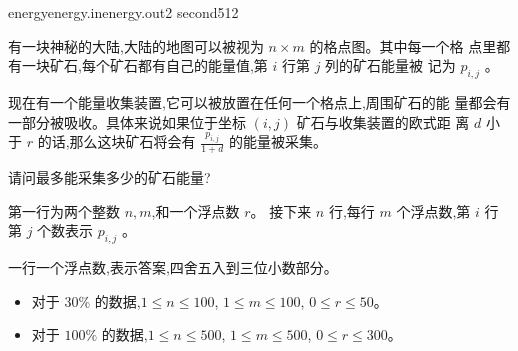 \documentclass[11pt,a4paper,oneside]{article}
\begin{document}
\begin{problem}{energy}{energy.in}{energy.out}{2 second}{512}
	
	有一块神秘的大陆,大陆的地图可以被视为 $n \times m$ 的格点图。其中每一个格
	点里都有一块矿石,每个矿石都有自己的能量值,第 $i$ 行第 $j$ 列的矿石能量被
	记为 $p_{i,j}$ 。
	
	现在有一个能量收集装置,它可以被放置在任何一个格点上,周围矿石的能
	量都会有一部分被吸收。具体来说如果位于坐标 $(i, j)$ 矿石与收集装置的欧式距
	离 $d$ 小于 $r$ 的话,那么这块矿石将会有 $\frac{p_{i,j}}{1+d}$
	的能量被采集。
	
	请问最多能采集多少的矿石能量?
	
	\InputFile
	
	第一行为两个整数 $n, m$,和一个浮点数 $r$。
	接下来 $n$ 行,每行 $m$ 个浮点数,第 $i$ 行第 $j$ 个数表示 $p_{i,j}$ 。

	\OutputFile
	
	一行一个浮点数,表示答案,四舍五入到三位小数部分。
	
	\Example
	
	\begin{example}
	\end{example}

	\Note
	
	\begin{itemize}
		\item 对于 $30\%$ 的数据,$1 \leq n \leq 100$, $1 \leq m \leq 100$, $0 \leq r \leq 50$。
		\item 对于 $100\%$ 的数据,$1 \leq n \leq 500$, $1 \leq m \leq 500$, $0 \leq r \leq 300$。
	\end{itemize}

\end{problem}
\end{document}
